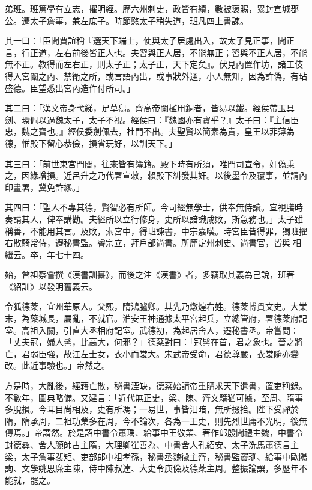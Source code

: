 \begin{pinyinscope}
 弟班。班篤學有立志，擢明經。歷六州刺史，政皆有績，數被褒賜，累封宣城郡公。遷太子詹事，兼左庶子。時節愍太子稍失道，班凡四上書諫。



 其一曰：「臣聞賈誼稱『選天下端士，使與太子居處出入，故太子見正事，聞正言，行正道，左右前後皆正人也。夫習與正人居，不能無正；習與不正人居，不能無不正。教得而左右正，則太子正；太子正，天下定矣』。伏見內置作坊，諸工伎得入宮闈之內、禁衛之所，或言語內出，或事狀外通，小人無知，因為詐偽，有玷盛德。臣望悉出宮內造作付所司。」



 其二曰：「漢文帝身弋綈，足草舄。齊高帝闌檻用銅者，皆易以鐵。經侯帶玉具劍、環佩以過魏太子，太子不視。經侯曰：『魏國亦有寶乎？』太子曰：『主信臣忠，魏之寶也。』經侯委劍佩去，杜門不出。夫聖賢以簡素為貴，皇王以菲薄為德，惟殿下留心恭儉，損省玩好，以訓天下。」



 其三曰：「前世東宮門閤，往來皆有簿籍。殿下時有所須，唯門司宣令，奸偽乘之，因緣增損。近呂升之乃代署宣敕，賴殿下糾發其奸。以後墨令及覆事，並請內印畫署，冀免詐繆。」



 其四曰：「聖人不專其德，賢智必有所師。今司經無學士，供奉無侍讀。宜視膳時奏請其人，俾奉講勸。夫經所以立行修身，史所以諳識成敗，斯急務也。」太子雖稱善，不能用其言。及敗，索宮中，得班諫書，中宗嘉嘆。時宮臣皆得罪，獨班擢右散騎常侍，遷秘書監。睿宗立，拜戶部尚書。所歷定州刺史、尚書官，皆與相繼云。卒，年七十四。



 始，曾祖察嘗撰《漢書訓纂》，而後之注《漢書》者，多竊取其義為己說，班著《紹訓》以發明舊義云。



 令狐德棻，宜州華原人。父熙，隋鴻臚卿。其先乃燉煌右姓。德棻博貫文史。大業末，為藥城長，屬亂，不就官。淮安王神通據太平宮起兵，立總管府，署德棻府記室。高祖入關，引直大丞相府記室。武德初，為起居舍人，遷秘書丞。帝嘗問：「丈夫冠，婦人髻，比高大，何邪？」德棻對曰：「冠髻在首，君之象也。晉之將亡，君弱臣強，故江左士女，衣小而裳大。宋武帝受命，君德尊嚴，衣裳隨亦變改。此近事驗也。」帝然之。



 方是時，大亂後，經藉亡散，秘書湮缺，德棻始請帝重購求天下遺書，置吏稱錄。不數年，圖典略備。又建言：「近代無正史，梁、陳、齊文籍猶可據，至周、隋事多脫損。今耳目尚相及，史有所馮；一易世，事皆汩暗，無所掇拾。陛下受禪於隋，隋承周，二祖功業多在周，今不論次，各為一王史，則先烈世庸不光明，後無傳焉。」帝謂然。於是詔中書令蕭瑀、給事中王敬業、著作郎殷聞禮主魏，中書令封德彞、舍人顏師古主隋，大理卿崔善為、中書舍人孔紹安、太子洗馬蕭德言主梁，太子詹事裴矩、吏部郎中祖孝孫，秘書丞魏徵主齊，秘書監竇璡、給事中歐陽詢、文學姚思廉主陳，侍中陳叔達、大史令庾儉及德棻主周。整振論譔，多歷年不能就，罷之。




\end{pinyinscope}
